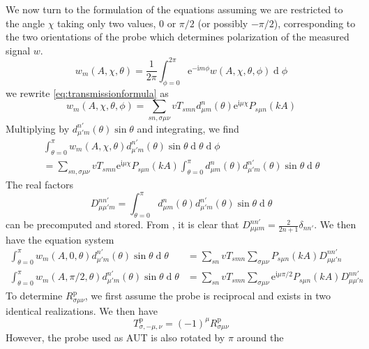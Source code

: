\documentclass[a4paper,12pt]{article}
\newcommand{\mrm}[1]{\mathrm{#1}}
\newcommand{\diff}{\operatorname{d}\!}
\newcommand{\iu}{\mrm{i}}
\newcommand{\eu}{\mrm{e}}
\begin{document}
We now turn to the formulation of the equations assuming we are
restricted to the angle $\chi$ taking only two values, 0 or $\pi/2$ (or
possibly $-\pi/2$), corresponding to the two orientations of the probe
which determines polarization of the measured signal $w$.
\begin{equation}
  w_{m}(A,\chi,\theta) = \frac{1}{2\pi}\int_{\phi=0}^{2\pi} \eu^{-\iu m\phi}w(A,\chi,\theta,\phi) \diff\phi
\end{equation}
we rewrite \eqref{eq:transmissionformula} as
\begin{equation}
  w_{m}(A,\chi,\theta,\phi) = \sum_{sn,\sigma\mu\nu} vT_{smn} d_{\mu m}^{n}(\theta) \eu^{\iu\mu\chi} P_{s\mu n}(kA)
\end{equation}
Multiplying by $d_{\mu'm}^{n'}(\theta)\sin\theta$ and integrating, we find
\begin{multline}
  \int_{\theta=0}^{\pi}w_{m}(A,\chi,\theta) d_{\mu'm}^{n'}(\theta) \sin\theta\diff\theta\diff\phi \\
  = \sum_{sn,\sigma\mu\nu} vT_{smn}\eu^{\iu\mu\chi} P_{s\mu n}(kA)\int_{\theta=0}^{\pi}  d_{\mu m}^{n}(\theta) d_{\mu'm}^{n'}(\theta) \sin\theta \diff\theta 
\end{multline}
The real factors
\begin{equation}
  D_{\mu\mu'm}^{nn'} = \int_{\theta=0}^{\pi}  d_{\mu m}^{n}(\theta) d_{\mu'm}^{n'}(\theta) \sin\theta \diff\theta 
\end{equation}
can be precomputed and stored. From \cite[Eq. (A2.10)]{Hansen1988}, it
is clear that $D_{\mu\mu m}^{nn'} = \frac{2}{2n+1}\delta_{nn'}$. We
then have the equation system
\begin{align}
  \int_{\theta=0}^{\pi}w_{m}(A,0,\theta)d_{\mu'm}^{n'}(\theta)\sin\theta\diff\theta &= \sum_{sn} vT_{smn} \sum_{\sigma\mu\nu} P_{s\mu n}(kA) D_{\mu\mu'n}^{nn'} \label{eq:probecorrectionA} \\
  \int_{\theta=0}^{\pi}w_{m}(A,\pi/2,\theta)d_{\mu'm}^{n'}(\theta)\sin\theta\diff\theta &= \sum_{sn} vT_{smn} \sum_{\sigma\mu\nu} \eu^{\iu\mu\pi/2} P_{s\mu n}(kA) D_{\mu\mu'n}^{nn'} \label{eq:probecorrectionB}
\end{align}
To determine $R_{\sigma\mu\nu}^{\mrm{p}}$, we first assume the probe
is reciprocal and exists in two identical realizations. We then have \cite[Eq. (3.21)]{Hansen1988}
\begin{equation}
  T_{\sigma,-\mu,\nu}^{\mrm{p}} = (-1)^{\mu} R_{\sigma\mu\nu}^{\mrm{p}}
\end{equation}
However, the probe used as AUT is also rotated by $\pi$ around the
\end{document}
